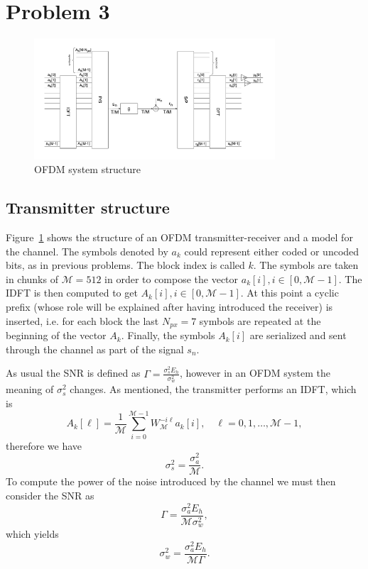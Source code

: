 \documentclass[10pt]{article}
\newcommand{\ofdM} {\mathcal{M}}
\begin{document}
\FloatBarrier

\section*{Problem 3}

\begin{figure}[h!]
	\centering
	\includegraphics[width = 0.8\textwidth]{OFDM}
	\caption{OFDM system structure}
	\label{fig:OFDM}
\end{figure}

\subsection*{Transmitter structure}
Figure~\ref{fig:OFDM} shows the structure of an OFDM transmitter-receiver and a model for the channel. The symbols denoted by $a_k$ could represent either coded or uncoded bits, as in previous problems. The block index is called $k$. The symbols are taken in chunks of $\ofdM = 512$ in order to compose the vector $a_k[i], i \in [0, \ofdM - 1]$. The IDFT is then computed to get $A_k[i], i\in [0, \ofdM-1]$. At this point a cyclic prefix (whose role will be explained after having introduced the receiver) is inserted, i.e. for each block the last $N_{px} = 7$ symbols are repeated at the beginning of the vector $A_k$. Finally, the symbols $A_k[i]$ are serialized and sent through the channel as part of the signal $s_n$.

As usual the SNR is defined as $\Gamma = \frac{\sigma_s^2 E_h}{\sigma_w^2}$, however in an OFDM system the meaning of $\sigma_s^2$ changes. As mentioned, the transmitter performs an IDFT, which is
\begin{equation}
	A_k[\ell] = \frac{1}{\ofdM} \sum_{i = 0}^{\ofdM - 1} W_{\ofdM}^{-i\ell} a_k[i], \quad \ell = 0, 1, \dots, \ofdM-1,
\end{equation}
therefore we have 
\begin{equation}
	\sigma_s^2 = \dfrac{\sigma_a^2}{\ofdM}.
\end{equation}
To compute the power of the noise introduced by the channel we must then consider the SNR as
\begin{equation}
	\Gamma = \dfrac{\sigma_a^2 E_h}{\ofdM \sigma_w^2},
	\label{eq:snrOFDM}
\end{equation}
which yields
\begin{equation}
	\sigma_w^2 = \dfrac{\sigma_a^2 E_h}{\ofdM \Gamma}.
\end{equation}
\end{document}
